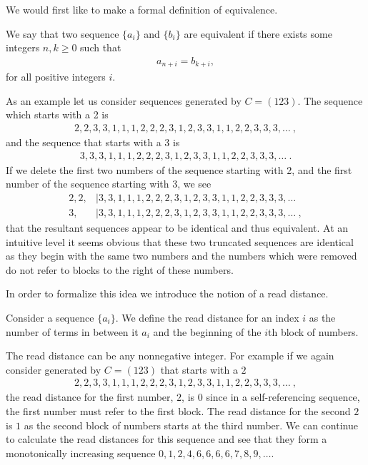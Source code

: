 \documentclass[runningheads,a4paper]{llncs}
\begin{document}
We would first like to make a formal definition of equivalence. 
\begin{definition}
We say that two sequence $\{a_i\}$ and $\{b_i\}$ are equivalent if there exists some integers $n, k \geq 0$ such that 
\begin{align*}
a_{n+i} = b_{k+i},
\end{align*}
for all positive integers $i$. 
\end{definition}

As an example let us consider sequences generated by $C = (123)$. The sequence which starts with a 2 is 
\begin{align*}
2,2,3,3,1,1,1,2,2,2,3,1,2,3,3,1,1,2,2,3,3,3,\dots \ ,
\end{align*}
and the sequence that starts with a 3 is 
\begin{align*}
3,3,3,1,1,1,2,2,2,3,1,2,3,3,1,1,2,2,3,3,3,\dots \ .
\end{align*}
If we delete the first two numbers of the sequence starting with 2, and the first number of the sequence starting with 3, we see 
\begin{align*}
2,2,&|3,3,1,1,1,2,2,2,3,1,2,3,3,1,1,2,2,3,3,3,\dots\\
3,&|3,3,1,1,1,2,2,2,3,1,2,3,3,1,1,2,2,3,3,3,\dots \ ,
\end{align*}
that the resultant sequences appear to be identical and thus equivalent. At an intuitive level it seems obvious that these two truncated sequences are identical as they begin with the same two numbers and the numbers which were removed do not refer to blocks to the right of these numbers.   

In order to formalize this idea we introduce the notion of a read distance.  
\begin{definition} Consider a sequence $\{a_i\}$. We define the read distance for an index $i$ as the number of terms in between it $a_i$ and the beginning of the $i$th block of numbers.
\end{definition}
The read distance can be any nonnegative integer. For example if we again consider generated by $C = (1 2 3)$ that starts with a $2$
\begin{align*}
2,2,3,3,1,1,1,2,2,2,3,1,2,3,3,1,1,2,2,3,3,3,\dots \ ,
\end{align*}
the read distance for the first number, $2$, is $0$ since in a self-referencing sequence, the first number must refer to the first block. The read distance for the second $2$ is $1$ as the second block of numbers starts at the third number. We can continue to calculate the read distances for this sequence and see that they form a monotonically increasing sequence $0 ,1,2,4,6,6,6,6,7,8,9,\ldots$.
\end{document}
